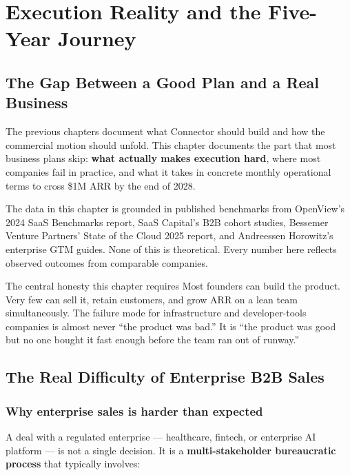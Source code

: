 \chapter{Execution Reality and the Five-Year Journey}

\section{The Gap Between a Good Plan and a Real Business}

The previous chapters document what Connector should build and how the
commercial motion should unfold. This chapter documents the part that most
business plans skip: \textbf{what actually makes execution hard}, where most
companies fail in practice, and what it takes in concrete monthly operational
terms to cross \$1M ARR by the end of 2028.

The data in this chapter is grounded in published benchmarks from OpenView's
2024 SaaS Benchmarks report, SaaS Capital's B2B cohort studies, Bessemer
Venture Partners' State of the Cloud 2025 report, and Andreessen Horowitz's
enterprise GTM guides. None of this is theoretical. Every number here reflects
observed outcomes from comparable companies.

\begin{warnbox}{The central honesty this chapter requires}
Most founders can build the product. Very few can sell it, retain customers, and
grow ARR on a lean team simultaneously. The failure mode for infrastructure and
developer-tools companies is almost never ``the product was bad.'' It is
``the product was good but no one bought it fast enough before the team ran out
of runway.''
\end{warnbox}

\section{The Real Difficulty of Enterprise B2B Sales}

\subsection{Why enterprise sales is harder than expected}

A deal with a regulated enterprise — healthcare, fintech, or enterprise AI
platform — is not a single decision. It is a \textbf{multi-stakeholder
bureaucratic process} that typically involves:

